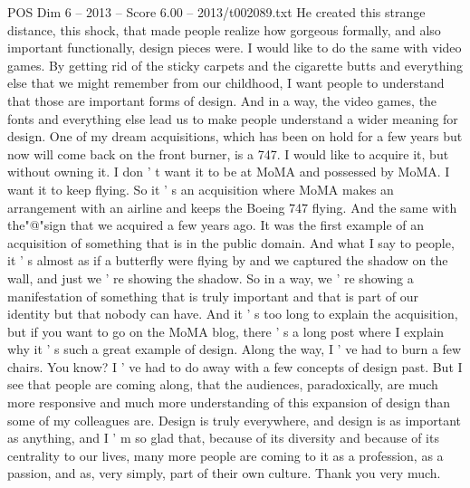 \begin{textsample}{POS Dim 6 – 2013 – Score 6.00 – 2013/t002089.txt}
He created this strange distance, this shock, that made people realize how gorgeous formally, and also important functionally, design pieces were.
I would like to do the same with video games.
By getting rid of the sticky carpets and the cigarette butts and everything else that we might remember from our childhood, I want people to understand that those are important forms of design.
And in a way, the video games, the fonts and everything else lead us to make people understand a wider meaning for design.
One of my dream acquisitions, which has been on hold for a few years but now will come back on the front burner, is a 747.
I would like to acquire it, but without owning it.
I don ' t want it to be at MoMA and possessed by MoMA.
I want it to keep flying.
So it ' s an acquisition where MoMA makes an arrangement with an airline and keeps the Boeing 747 flying.
And the same with the"@"sign that we acquired a few years ago.
It was the first example of an acquisition of something that is in the public domain.
And what I say to people, it ' s almost as if a butterfly were flying by and we captured the shadow on the wall, and just we ' re showing the shadow.
So in a way, we ' re showing a manifestation of something that is truly important and that is part of our identity but that nobody can have.
And it ' s too long to explain the acquisition, but if you want to go on the MoMA blog, there ' s a long post where I explain why it ' s such a great example of design.
Along the way, I ' ve had to burn a few chairs.
You know?
I ' ve had to do away with a few concepts of design past.
But I see that people are coming along, that the audiences, paradoxically, are much more responsive and much more understanding of this expansion of design than some of my colleagues are.
Design is truly everywhere, and design is as important as anything, and I ' m so glad that, because of its diversity and because of its centrality to our lives, many more people are coming to it as a profession, as a passion, and as, very simply, part of their own culture.
Thank you very much.

\end{textsample}
